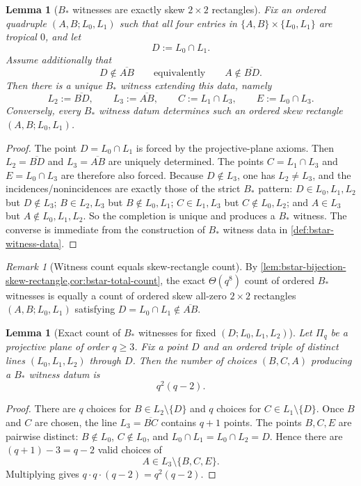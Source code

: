 \documentclass[11pt]{amsart}
\numberwithin{equation}{section}
\theoremstyle{plain}
\newtheorem{lemma}[theorem]{Lemma}
\theoremstyle{definition}
\theoremstyle{remark}
\newtheorem{remark}[theorem]{Remark}
\begin{document}
\begin{lemma}[$B_*$ witnesses are exactly skew $2\times2$ rectangles]
\label{lem:bstar-bijection-skew-rectangle}
Fix an ordered quadruple $(A,B;L_0,L_1)$ such that all four entries in
$\{A,B\}\times\{L_0,L_1\}$ are tropical $0$, and let
\[
D:=L_0\cap L_1.
\]
Assume additionally that
\[
D\notin \overline{AB}
\qquad\text{equivalently}\qquad
A\notin \overline{BD}.
\]
Then there is a unique $B_*$ witness extending this data, namely
\[
L_2:=\overline{BD},
\qquad
L_3:=\overline{AB},
\qquad
C:=L_1\cap L_3,
\qquad
E:=L_0\cap L_3.
\]
Conversely, every $B_*$ witness datum determines such an ordered skew rectangle $(A,B;L_0,L_1)$.
\end{lemma}

\begin{proof}
The point $D=L_0\cap L_1$ is forced by the projective-plane axioms. Then $L_2=\overline{BD}$ and
$L_3=\overline{AB}$ are uniquely determined. The points $C=L_1\cap L_3$ and $E=L_0\cap L_3$ are therefore also forced.
Because $D\notin L_3$, one has $L_2\neq L_3$, and the incidences/nonincidences are exactly those of the strict $B_*$ pattern:
$D\in L_0,L_1,L_2$ but $D\notin L_3$; $B\in L_2,L_3$ but $B\notin L_0,L_1$; $C\in L_1,L_3$ but $C\notin L_0,L_2$;
and $A\in L_3$ but $A\notin L_0,L_1,L_2$. So the completion is unique and produces a $B_*$ witness. The converse is immediate from the construction of $B_*$ witness data in \cref{def:bstar-witness-data}.
\end{proof}

\begin{remark}[Witness count equals skew-rectangle count]
\label{rem:bstar-count-skew-rectangles}
By \cref{lem:bstar-bijection-skew-rectangle,cor:bstar-total-count}, the exact $\Theta(q^8)$ count of ordered $B_*$ witnesses is equally a count of ordered skew all-zero $2\times2$ rectangles $(A,B;L_0,L_1)$ satisfying $D=L_0\cap L_1\notin\overline{AB}$.
\end{remark}

\begin{lemma}[Exact count of $B_*$ witnesses for fixed $(D;L_0,L_1,L_2)$]
\label{lem:bstar-count-fixed-triple}
Let $\Pi_q$ be a projective plane of order $q\ge 3$. Fix a point $D$ and an ordered triple of distinct lines $(L_0,L_1,L_2)$ through $D$. Then the number of choices $(B,C,A)$ producing a $B_*$ witness datum is
\[
q^2(q-2).
\]
\end{lemma}

\begin{proof}
There are $q$ choices for $B\in L_2\setminus\{D\}$ and $q$ choices for $C\in L_1\setminus\{D\}$. Once $B$ and $C$ are chosen, the line $L_3=\overline{BC}$ contains $q+1$ points. The points $B,C,E$ are pairwise distinct: $B\notin L_0$, $C\notin L_0$, and $L_0\cap L_1=L_0\cap L_2=D$. Hence there are $(q+1)-3=q-2$ valid choices of
\[
A\in L_3\setminus\{B,C,E\}.
\]
Multiplying gives $q\cdot q\cdot(q-2)=q^2(q-2)$.
\end{proof}
\end{document}
